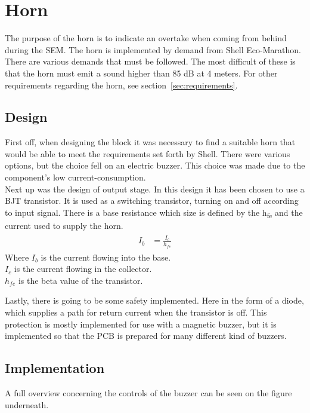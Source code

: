 \section{Horn}
The purpose of the horn is to indicate an overtake when coming from behind during the SEM. The horn is implemented by demand from Shell Eco-Marathon. There are various demands that must be followed. The most difficult of these is that the horn must emit a sound higher than 85 dB at 4 meters. For other requirements regarding the horn, see section~\vref{sec:requirements}.  

\subsection{Design}
First off, when designing the block it was necessary to find a suitable horn that would be able to meet the requirements set forth by Shell. There were various options, but the choice fell on an electric buzzer. This choice was made due to the component's low current-consumption.\\
Next up was the design of output stage. In this design it has been chosen to use a BJT transistor. It is used as a switching transistor, turning on and off according to input signal. There is a base resistance which size is defined by the h\textsubscript{fe} and the current used to supply the horn.
\begin{align}
	\begin{split}
		I_b &= \frac{I_c}{h_{fe}}
	\end{split}
\end{align}
Where $I_b$ is the current flowing into the base. \\ 
$I_c$ is the current flowing in the collector. \\ 
$h_{fe}$ is the beta value of the transistor.

Lastly, there is going to be some safety implemented. Here in the form of a diode, which supplies a path for return current when the transistor is off. This protection is mostly implemented for use with a magnetic buzzer, but it is implemented so that the PCB is prepared for many different kind of buzzers.   

\newpage
\subsection{Implementation}
A full overview concerning the controls of the buzzer can be seen on the figure underneath.

